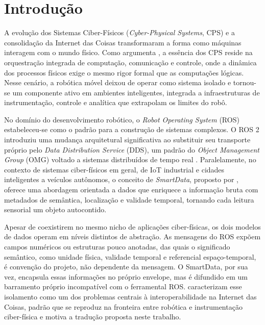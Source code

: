 \documentclass[
    12pt,
    oneside,
    a4paper,
    chapter=TITLE,
    section=TITLE,
    english,
    brazil
]{abntex2}
\begin{document}
\chapter{Introdução}
\label{cap:introducao}

A evolução dos Sistemas Ciber-Físicos (\textit{Cyber-Physical Systems},
CPS) e a consolidação da Internet das Coisas transformaram a forma como
máquinas interagem com o mundo físico. Como argumenta ,
a essência dos CPS reside na orquestração integrada de computação,
comunicação e controle, onde a dinâmica dos processos físicos exige o mesmo
rigor formal que as computações lógicas. Nesse cenário, a robótica móvel
deixou de operar como sistema isolado e tornou-se um componente ativo em
ambientes inteligentes, integrada a infraestruturas de instrumentação,
controle e analítica que extrapolam os limites do robô.

No domínio do desenvolvimento robótico, o \textit{Robot Operating System}
(ROS) estabeleceu-se como o padrão para a construção de sistemas
complexos. O ROS 2 introduziu uma mudança arquitetural significativa ao
substituir seu transporte próprio pelo \textit{Data Distribution Service}
(DDS), um padrão do \textit{Object Management Group} (OMG) voltado a sistemas distribuídos de tempo real
\cite{maruyama2016ros2,macenski2022ros2}. Paralelamente, no contexto de
sistemas ciber-físicos em geral, de IoT industrial e cidades inteligentes
a veículos autônomos, o conceito de \textit{SmartData},
proposto por , oferece uma abordagem
orientada a dados que enriquece a informação bruta com metadados de
semântica, localização e validade temporal, tornando cada leitura sensorial
um objeto autocontido.

Apesar de coexistirem no mesmo nicho de aplicações ciber-físicas, os dois
modelos de dados operam em níveis distintos de abstração. As mensagens
do ROS expõem campos numéricos ou estruturas pouco anotadas, das quais o
significado semântico, como unidade física, validade temporal e referencial
espaço-temporal, é convenção do projeto, não dependente da
mensagem. O SmartData, por sua vez, encapsula essas informações no próprio
envelope, mas é difundido em um barramento próprio incompatível com o
ferramental ROS.  caracterizam esse isolamento como um dos
problemas centrais à interoperabilidade na Internet das Coisas, padrão que
se reproduz na fronteira entre robótica e instrumentação ciber-física e
motiva a tradução proposta neste trabalho.
\end{document}
